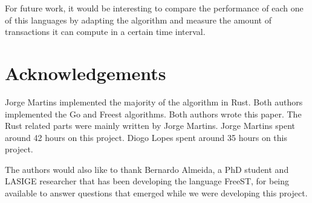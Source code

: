 \documentclass[runningheads]{llncs}
\begin{document}
For future work, it would be interesting to compare the performance of each one of this languages by adapting the algorithm and measure the amount of transactions it can compute in a certain time interval.
\section*{Acknowledgements}
Jorge Martins implemented the majority of the algorithm in Rust. Both authors implemented the Go and Freest algorithms.
Both authors wrote this paper. The Rust related parts were mainly written by Jorge Martins.
Jorge Martins spent around 42 hours on this project. Diogo Lopes spent around 35 hours on this project.

The authors would also like to thank Bernardo Almeida, a PhD student and LASIGE researcher that has been developing the language FreeST, for being available to answer questions that emerged while we were developing this project.


\end{document}
